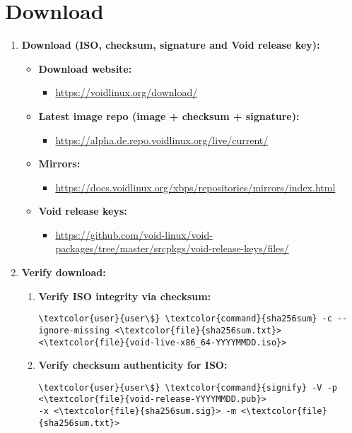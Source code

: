 \documentclass[10pt, a4paper, onecolumn, oneside, titlepage, openany]{book}
\begin{document}
\section{Download}
\begin{enumerate}
    \item \textbf{Download (ISO, checksum, signature and Void release key):}
    \begin{itemize}
        \item \textbf{Download website:}
        \begin{itemize}
            \item \url{https://voidlinux.org/download/}
        \end{itemize}
        \item \textbf{Latest image repo (image + checksum + signature):}
        \begin{itemize}
            \item \url{https://alpha.de.repo.voidlinux.org/live/current/}
        \end{itemize}
        \item \textbf{Mirrors:}
        \begin{itemize}
            \item \url{https://docs.voidlinux.org/xbps/repositories/mirrors/index.html}
        \end{itemize}
        \item \textbf{Void release keys:}
        \begin{itemize}
            \item \url{https://github.com/void-linux/void-packages/tree/master/srcpkgs/void-release-keys/files/}
        \end{itemize}
    \end{itemize}
    \item \textbf{Verify download:}
    \begin{enumerate}
        \item \textbf{Verify ISO integrity via checksum:}
\begin{Verbatim}[commandchars=\\\{\}]
\textcolor{user}{user\$} \textcolor{command}{sha256sum} -c --ignore-missing <\textcolor{file}{sha256sum.txt}>
<\textcolor{file}{void-live-x86_64-YYYYMMDD.iso}>
\end{Verbatim}
        \item \textbf{Verify checksum authenticity for ISO:}
\begin{Verbatim}[commandchars=\\\{\}]
\textcolor{user}{user\$} \textcolor{command}{signify} -V -p <\textcolor{file}{void-release-YYYYMMDD.pub}>
-x <\textcolor{file}{sha256sum.sig}> -m <\textcolor{file}{sha256sum.txt}>
\end{Verbatim}
    \end{enumerate}
\end{enumerate}
\end{document}
